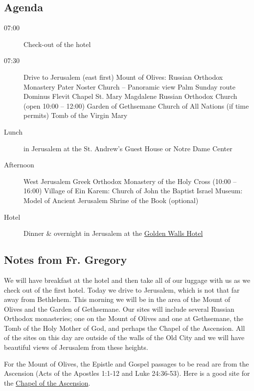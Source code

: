 \documentclass[letterpaper]{report}
\begin{document}
\subsection{Agenda}
\begin{description}
	\item[07:00] Check-out of the hotel
 \item[07:30] Drive to Jerusalem (east first)
	    \subitem Mount of Olives: Russian Orthodox Monastery
	    \subitem Pater Noster Church -- Panoramic view
	    \subitem Palm Sunday route
	    \subitem Dominus Flevit Chapel
	    \subitem St. Mary Magdalene Russian Orthodox Church
	        (open 10:00 – 12:00)
	    \subitem Garden of Gethsemane
	    \subitem Church of All Nations (if time permits)
	    \subitem Tomb of the Virgin Mary
	\item[Lunch] in Jerusalem at the
			St. Andrew’s Guest House or Notre Dame Center
	\item[Afternoon] West Jerusalem
	    \subitem Greek Orthodox Monastery of the Holy Cross (10:00 – 16:00)
		\subitem Village of Ein Karem: Church of John the Baptist 
		\subitem Israel Museum: Model of Ancient Jerusalem
		\subitem Shrine of the Book (optional)
	\item[Hotel] Dinner \& overnight in Jerusalem at the
	    \href{http://goldenwalls.com/}{Golden Walls Hotel}
\end{description}

\subsection{Notes from Fr. Gregory}
We will have breakfast at the hotel and then take all of our luggage with us 
as we check out of the first hotel.
Today we drive to Jerusalem, which is not that far away from Bethlehem.
This morning we will be in the area of the Mount of Olives and the Garden of
Gethsemane.
Our sites will include several Russian Orthodox monasteries;
one on the Mount of Olives and one at Gethsemane,
the Tomb of the Holy Mother of God,
and perhaps the Chapel of the Ascension.
All of the sites on this day are outside of the walls of the Old City and we
will have beautiful views of Jerusalem from these heights.

For the Mount of Olives, the Epistle and Gospel passages to be read are from
the Ascension (Acts of the Apostles 1:1-12 and Luke 24:36-53).
Here is a good site for the 
\href{http://www.sacred-destinations.com/israel/jerusalem-chapel-of-ascension}{
    Chapel of the Ascension}.
\end{document}
